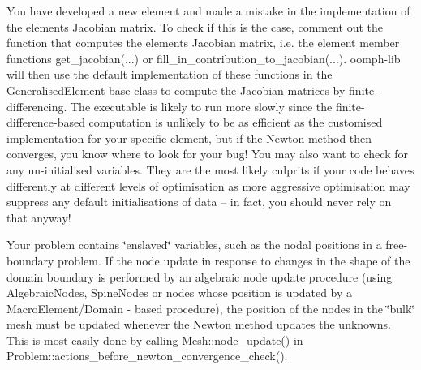 \begin{DoxyItemize}
\begin{DoxyEnumerate}
\item You have developed a new element and made a mistake in the implementation of the element\textquotesingle{}s Jacobian matrix. To check if this is the case, comment out the function that computes the element\textquotesingle{}s Jacobian matrix, i.\+e. the element member functions {\ttfamily get\+\_\+jacobian}(...) or {\ttfamily fill\+\_\+in\+\_\+contribution\+\_\+to\+\_\+jacobian}(...). {\ttfamily oomph-\/lib} will then use the default implementation of these functions in the {\ttfamily Generalised\+Element} base class to compute the Jacobian matrices by finite-\/differencing. The executable is likely to run more slowly since the finite-\/difference-\/based computation is unlikely to be as efficient as the customised implementation for your specific element, but if the Newton method then converges, you know where to look for your bug! You may also want to check for any un-\/initialised variables. They are the most likely culprits if your code behaves differently at different levels of optimisation as more aggressive optimisation may suppress any default initialisations of data -- in fact, you should never rely on that anyway! ~\newline
~\newline

\item Your problem contains \char`\"{}enslaved\char`\"{} variables, such as the nodal positions in a free-\/boundary problem. If the node update in response to changes in the shape of the domain boundary is performed by an algebraic node update procedure (using {\ttfamily Algebraic\+Nodes}, {\ttfamily Spine\+Nodes} or nodes whose position is updated by a {\ttfamily Macro\+Element/\+Domain} -\/ based procedure), the position of the nodes in the \char`\"{}bulk\char`\"{} mesh must be updated whenever the Newton method updates the unknowns. This is most easily done by calling {\ttfamily Mesh\+::node\+\_\+update()} in {\ttfamily Problem\+::actions\+\_\+before\+\_\+newton\+\_\+convergence\+\_\+check()}.
\end{DoxyEnumerate}
\end{DoxyItemize}

~\newline
~\newline


 

